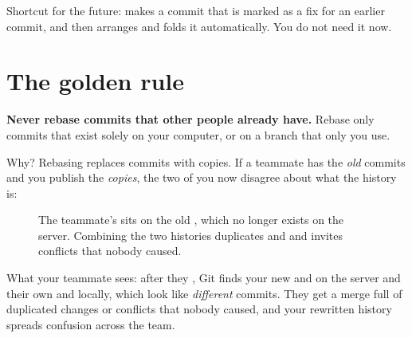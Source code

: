 \begin{quickfact}
Shortcut for the future:  makes a commit that is marked as a fix for an earlier commit, and  then arranges and folds it automatically. You do not need it now.
\end{quickfact}

\section{The golden rule}\label{sec:golden}

\begin{keyidea}
\textbf{Never rebase commits that other people already have.} Rebase only commits that exist solely on your computer, or on a branch that only you use.
\end{keyidea}

Why? Rebasing replaces commits with copies. If a teammate has the \emph{old} commits and you publish the \emph{copies}, the two of you now disagree about what the history is:

\begin{figure}[H]
\centering
{}
\caption{The teammate's  sits on the old , which no longer exists on the server. Combining the two histories duplicates  and  and invites conflicts that nobody caused.}
\label{fig:golden}
\end{figure}

What your teammate sees: after they , Git finds your new  and  on the server and their own  and  locally, which look like \emph{different} commits. They get a merge full of duplicated changes or conflicts that nobody caused, and your rewritten history spreads confusion across the team.

